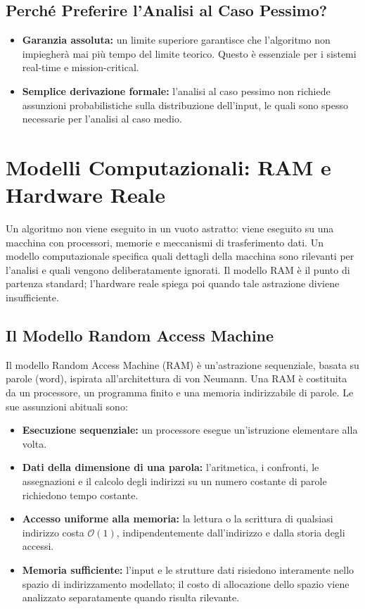 \subsection{Perché Preferire l'Analisi al Caso Pessimo?}

\begin{itemize}
  \item \textbf{Garanzia assoluta:} un limite superiore garantisce che l'algoritmo non impiegherà mai più tempo del limite teorico. Questo è essenziale per i sistemi real-time e mission-critical.
  \item \textbf{Semplice derivazione formale:} l'analisi al caso pessimo non richiede assunzioni probabilistiche sulla distribuzione dell'input, le quali sono spesso necessarie per l'analisi al caso medio.
\end{itemize}

\section{Modelli Computazionali: RAM e Hardware Reale}
\label{sec:ram-model}

Un algoritmo non viene eseguito in un vuoto astratto: viene eseguito su una macchina con processori, memorie e meccanismi di trasferimento dati. Un modello computazionale specifica quali dettagli della macchina sono rilevanti per l'analisi e quali vengono deliberatamente ignorati. Il modello RAM è il punto di partenza standard; l'hardware reale spiega poi quando tale astrazione diviene insufficiente.

\subsection{Il Modello Random Access Machine}

Il modello Random Access Machine (RAM) è un'astrazione sequenziale, basata su parole (word), ispirata all'architettura di von Neumann. Una RAM è costituita da un processore, un programma finito e una memoria indirizzabile di parole. Le sue assunzioni abituali sono:

\begin{itemize}
  \item \textbf{Esecuzione sequenziale:} un processore esegue un'istruzione elementare alla volta.
  \item \textbf{Dati della dimensione di una parola:} l'aritmetica, i confronti, le assegnazioni e il calcolo degli indirizzi su un numero costante di parole richiedono tempo costante.
  \item \textbf{Accesso uniforme alla memoria:} la lettura o la scrittura di qualsiasi indirizzo costa $\mathcal{O}(1)$, indipendentemente dall'indirizzo e dalla storia degli accessi.
  \item \textbf{Memoria sufficiente:} l'input e le strutture dati risiedono interamente nello spazio di indirizzamento modellato; il costo di allocazione dello spazio viene analizzato separatamente quando risulta rilevante.
\end{itemize}

